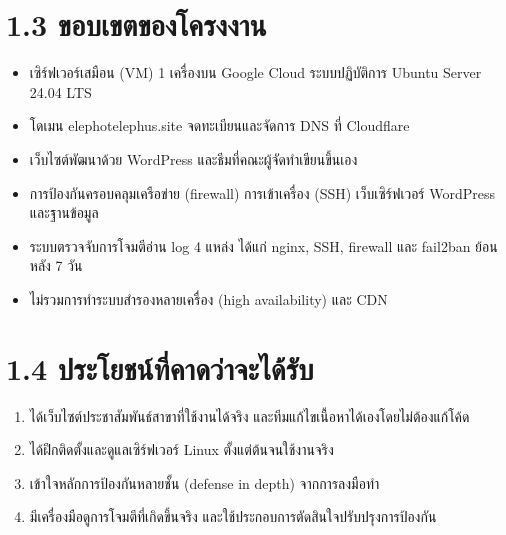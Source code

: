 \section*{1.3 ขอบเขตของโครงงาน}

\begin{itemize}
\tightlist
\item
  เซิร์ฟเวอร์เสมือน (VM) 1 เครื่องบน Google Cloud ระบบปฏิบัติการ Ubuntu Server 24.04 LTS
\item
  โดเมน elephotelephus.site จดทะเบียนและจัดการ DNS ที่ Cloudflare
\item
  เว็บไซต์พัฒนาด้วย WordPress และธีมที่คณะผู้จัดทำเขียนขึ้นเอง
\item
  การป้องกันครอบคลุมเครือข่าย (firewall) การเข้าเครื่อง (SSH) เว็บเซิร์ฟเวอร์ WordPress และฐานข้อมูล
\item
  ระบบตรวจจับการโจมตีอ่าน log 4 แหล่ง ได้แก่ nginx, SSH, firewall และ fail2ban ย้อนหลัง 7 วัน
\item
  ไม่รวมการทำระบบสำรองหลายเครื่อง (high availability) และ CDN
\end{itemize}

\section*{1.4 ประโยชน์ที่คาดว่าจะได้รับ}

\begin{enumerate}
\def\labelenumi{\arabic{enumi}.}
\tightlist
\item
  ได้เว็บไซต์ประชาสัมพันธ์สาขาที่ใช้งานได้จริง และทีมแก้ไขเนื้อหาได้เองโดยไม่ต้องแก้โค้ด
\item
  ได้ฝึกติดตั้งและดูแลเซิร์ฟเวอร์ Linux ตั้งแต่ต้นจนใช้งานจริง
\item
  เข้าใจหลักการป้องกันหลายชั้น (defense in depth) จากการลงมือทำ
\item
  มีเครื่องมือดูการโจมตีที่เกิดขึ้นจริง และใช้ประกอบการตัดสินใจปรับปรุงการป้องกัน
\end{enumerate}
